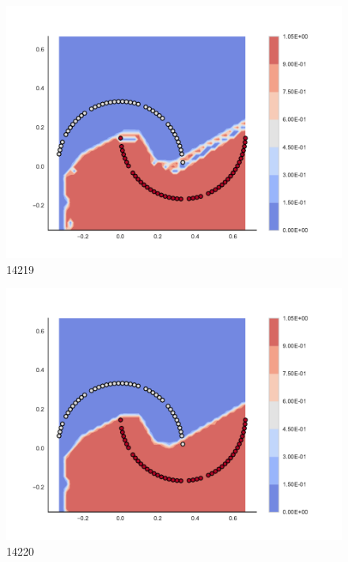 \begin{subfigure}[b]{0.09\textwidth}
    \includegraphics[clip, trim=2.35cm 1.75cm 4.5cm 0cm,width=\textwidth]{img/convergence/14219.pdf}
    \caption{14219}
    \label{fig:convergence_14219}
\end{subfigure}
%
\begin{subfigure}[b]{0.09\textwidth}
    \includegraphics[clip, trim=2.35cm 1.75cm 4.5cm 0cm,width=\textwidth]{img/convergence/14220.pdf}
    \caption{14220}
    \label{fig:convergence_14220}
\end{subfigure}
%
